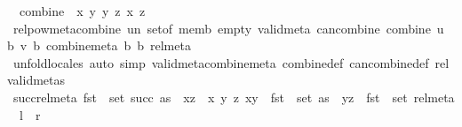 \begin{isabellebody}
\ \ {\isachardoublequoteopen}combine\ {\isacharequal}{\kern0pt}\ {\isacharparenleft}{\kern0pt}{\isasymlambda}{\isacharparenleft}{\kern0pt}x{\isacharcomma}{\kern0pt}\ y{\isacharparenright}{\kern0pt}\ {\isacharparenleft}{\kern0pt}y{\isacharprime}{\kern0pt}{\isacharcomma}{\kern0pt}\ z{\isacharparenright}{\kern0pt}{\isachardot}{\kern0pt}\ {\isacharparenleft}{\kern0pt}x{\isacharcomma}{\kern0pt}\ z{\isacharparenright}{\kern0pt}{\isacharparenright}{\kern0pt}{\isachardoublequoteclose}\isanewline
\isanewline
{}\isamarkupfalse%
\ relpow{\isacharunderscore}{\kern0pt}meta{\isacharunderscore}{\kern0pt}combine\ un\ set{\isacharunderscore}{\kern0pt}of\ memb\ empty\ valid{\isacharunderscore}{\kern0pt}meta\ can{\isacharunderscore}{\kern0pt}combine\ combine\ {\isachardoublequoteopen}{\isasymlambda}u\ b{}\ v\ b{}{\isachardot}{\kern0pt}\ combine{\isacharunderscore}{\kern0pt}meta\ b{}\ b{}{\isachardoublequoteclose}\ rel{\isacharunderscore}{\kern0pt}meta\isanewline
%
\isadelimproof
\ \ %
\endisadelimproof
%
\isatagproof
{}\isamarkupfalse%
\ unfold{\isacharunderscore}{\kern0pt}locales\ {\isacharparenleft}{\kern0pt}auto\ simp{\isacharcolon}{\kern0pt}\ valid{\isacharunderscore}{\kern0pt}meta{\isacharunderscore}{\kern0pt}combine{\isacharunderscore}{\kern0pt}meta\ combine{\isacharunderscore}{\kern0pt}def\ can{\isacharunderscore}{\kern0pt}combine{\isacharunderscore}{\kern0pt}def\ rel{\isacharunderscore}{\kern0pt}valid{\isacharunderscore}{\kern0pt}metas{\isacharparenright}{\kern0pt}%
\endisatagproof
{\isafoldproof}%
%
\isadelimproof
\isanewline
%
\endisadelimproof
\isanewline
{}\isamarkupfalse%
\ succ{\isacharunderscore}{\kern0pt}rel{\isacharunderscore}{\kern0pt}meta{\isacharcolon}{\kern0pt}\ {\isachardoublequoteopen}fst\ {\isacharbackquote}{\kern0pt}\ set\ {\isacharparenleft}{\kern0pt}succ\ as{\isacharparenright}{\kern0pt}\ {\isacharequal}{\kern0pt}\ {\isacharbraceleft}{\kern0pt}{\isacharparenleft}{\kern0pt}x{\isacharcomma}{\kern0pt}z{\isacharparenright}{\kern0pt}\ {\isacharbar}{\kern0pt}\ x\ y\ z{\isachardot}{\kern0pt}\ {\isacharparenleft}{\kern0pt}x{\isacharcomma}{\kern0pt}y{\isacharparenright}{\kern0pt}\ {\isasymin}\ fst\ {\isacharbackquote}{\kern0pt}\ set\ as\ {\isasymand}\ {\isacharparenleft}{\kern0pt}y{\isacharcomma}{\kern0pt}z{\isacharparenright}{\kern0pt}\ {\isasymin}\ fst\ {\isacharbackquote}{\kern0pt}\ set\ rel{\isacharunderscore}{\kern0pt}meta{\isacharbraceright}{\kern0pt}{\isachardoublequoteclose}\ {\isacharparenleft}{\kern0pt}\ {\isachardoublequoteopen}{\isacharquery}{\kern0pt}l\ {\isacharequal}{\kern0pt}\ {\isacharquery}{\kern0pt}r{\isachardoublequoteclose}{\isacharparenright}{\kern0pt}\isanewline

\end{isabellebody}
